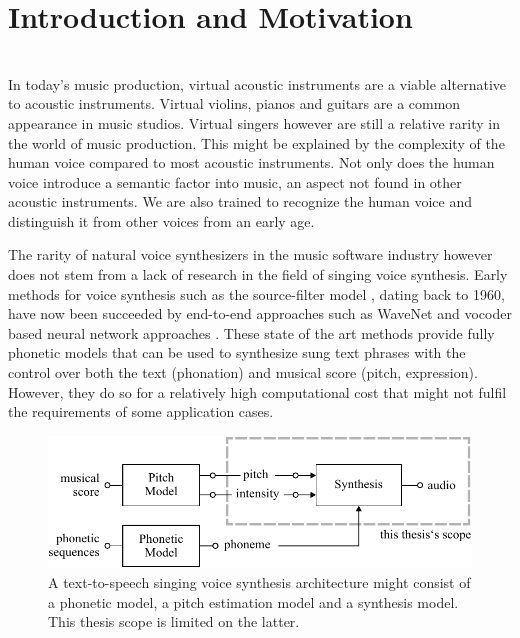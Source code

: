 \chapter{Introduction and Motivation}
\label{sec:Intro}
\\


In today's music production, virtual acoustic instruments are a viable alternative to acoustic instruments. Virtual violins, pianos and guitars are a common appearance in music studios. Virtual singers however are still a relative rarity in the world of music production.  This might be explained by the complexity of the human voice compared to most acoustic instruments. Not only does the human voice introduce a semantic factor into music, an aspect not found in other acoustic instruments. We are also trained to recognize the human voice and distinguish it from other voices from an early age.

The rarity of natural voice synthesizers in the music software industry however does not stem from a lack of research in the field of singing voice synthesis. Early methods for voice synthesis such as the source-filter model \cite{fant_acoustic_1960}, dating back to 1960, have now been succeeded by end-to-end approaches such as WaveNet \cite{oord_wavenet:_2016} and vocoder based neural network approaches \cite{chandna_wgansing:_2019}\cite{blaauw_neural_2017}. These state of the art methods provide fully phonetic models that can be used to synthesize sung text phrases with the control over both the text (phonation) and musical score (pitch, expression). However, they do so for a relatively high computational cost that might not fulfil the requirements of some application cases. 

\begin{figure}[H]
    \centering
    \includegraphics{Graphics/004_thesis_scope.pdf}
    \caption{A text-to-speech singing voice synthesis architecture might consist of a phonetic model, a pitch estimation model and a synthesis model. This thesis scope is limited on the latter.}
    \label{fig:thesis_architecture_scope}
\end{figure}

